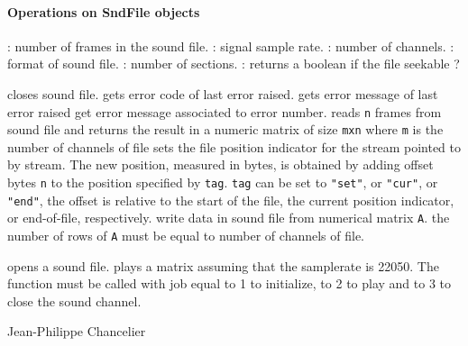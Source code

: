 \paragraph{Operations on SndFile objects}
\begin{itemize}
  : number of frames in the sound file. 
  : signal sample rate.
  : number of channels. 
  :  format of sound file. 
  : number of sections.
  : returns a boolean if the file seekable ? 
\end{itemize}
\begin{itemize}
   closes sound file. 
   gets error code of last error raised. 
   gets error message of last error raised
   get error message associated to error number.
    reads \verb+n+ frames from sound file and returns the 
  result in a numeric matrix of size \verb+mxn+ where \verb+m+ is the 
  number of channels of file
   sets the file position indicator for the stream pointed
       to by stream.  The new position, measured in bytes, is obtained  by  adding
       offset  bytes \verb+n+  to  the  position  specified by \verb+tag+. 
        \verb+tag+ can be set to \verb+"set"+, or \verb+"cur"+, or \verb+"end"+, 
	the offset is relative to the start of the
       file, the current position indicator, or end-of-file, respectively.
   write data in sound file from numerical matrix \verb+A+. 
  the number of rows of \verb+A+ must be equal to number of channels of file.
\end{itemize}

\begin{itemize}
   opens a sound file. 
     plays a matrix assuming that the samplerate is 22050.
    The function must be called with job equal to 1 to initialize, to 2 to play 
    and to 3 to close the sound channel.
\end{itemize}

\begin{examples}
  \begin{program}
  \end{program}
\end{examples}

\begin{manseealso}

\end{manseealso}

\begin{authors}
  Jean-Philippe Chancelier 
\end{authors}

